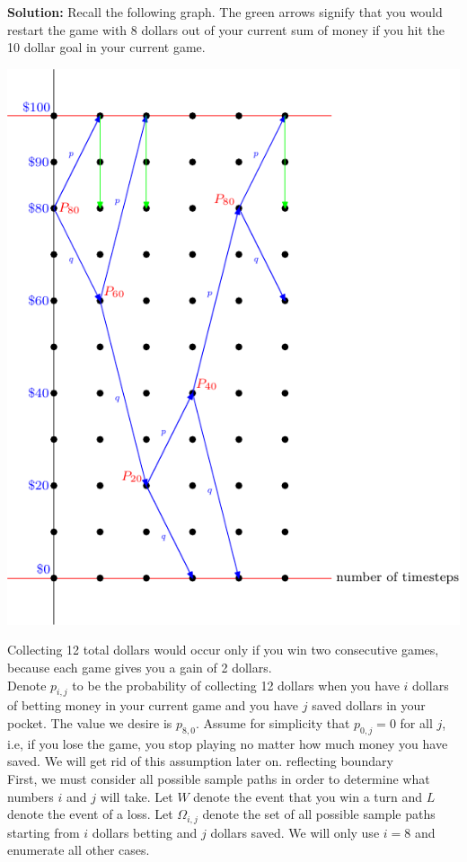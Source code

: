 \documentclass[12pt]{article}
\begin{document}
\textbf{Solution:} Recall the following graph. The green arrows signify that you would restart the game with 8 dollars out of your current sum of money if you hit the 10 dollar goal in your current game.
\begin{center}
\includegraphics[scale=0.9]{126figs-9.pdf}
\end{center}

Collecting 12 total dollars would occur only if you win two consecutive games, because each game gives you a gain of 2 dollars.\\

Denote $p_{i,j}$ to be the probability of collecting 12 dollars when you have $i$ dollars of betting money in your current game and you have $j$ saved dollars in your pocket. The value we desire is $p_{8,0}$. Assume for simplicity that $p_{0, j} = 0$ for all $j$, i.e, if you lose the game, you stop playing no matter how much money you have saved. We will get rid of this assumption later on. {\color{red} reflecting boundary} \\

First, we must consider all possible sample paths in order to determine what numbers $i$ and $j$ will take. Let $W$ denote the event that you win a turn and $L$ denote the event of a loss. Let $\Omega_{i, j}$ denote the set of all possible sample paths starting from $i$ dollars betting and $j$ dollars saved. We will only use $i = 8$ and enumerate all other cases.\\
\end{document}
